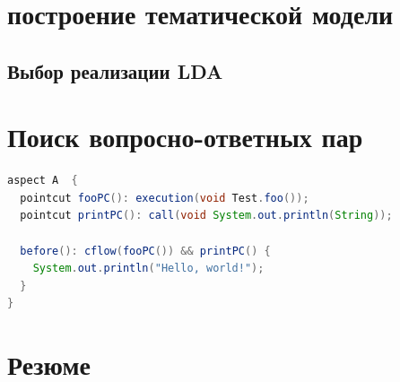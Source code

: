 \section{построение тематической модели}
\subsection{Выбор реализации LDA}
\label{sec:lda_choose}
\section{Поиск вопросно-ответных пар}

\Blindtext

  \begin{lstlisting}[language=Java, label={lst:aspectj_example}, 
  caption={Пример описания аспектов в AspectJ}]
aspect A  {
  pointcut fooPC(): execution(void Test.foo());
  pointcut printPC(): call(void System.out.println(String));
  
  before(): cflow(fooPC()) && printPC() {
    System.out.println("Hello, world!");
  }
}
  \end{lstlisting}

\section{Резюме}

\Blindtext
